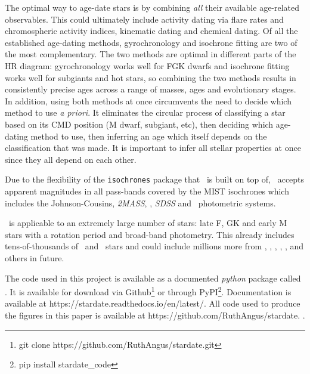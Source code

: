The optimal way to age-date stars is by combining {\it all} their available
age-related observables.
This could ultimately include activity dating via flare rates and
chromospheric activity indices, kinematic dating and chemical dating.
Of all the established age-dating methods, gyrochronology and isochrone
fitting are two of the most complementary.
The two methods are optimal in different parts of the HR diagram:
gyrochronology works well for FGK dwarfs and isochrone fitting works well for
subgiants and hot stars, so combining the two methods results in consistently
precise ages across a range of masses, ages and evolutionary stages.
In addition, using both methods at once circumvents the need to decide which
method to use {\it a priori}.
It eliminates the circular process of classifying a star based on its CMD
position (M dwarf, subgiant, etc), then deciding which age-dating method to
use, then inferring an age which itself depends on the classification that was
made.
It is important to infer all stellar properties at once since they all depend
on each other.

Due to the flexibility of the {\tt isochrones} package that \sd\ is built on
top of, \sd\ accepts apparent magnitudes in all pass-bands covered by the MIST
isochrones which includes the Johnson-Cousins, {\it 2MASS}, \Kepler, {\it
SDSS} and \Gaia\ photometric systems.

\sd\ is applicable to an extremely large number of stars: late F, GK and early
M stars with a rotation period and broad-band photometry.
This already includes tens-of-thousands of \kepler\ and \ktwo\ stars and could
include millions more from \tess, \lsst, \wfirst, \plato, \gaia, and others in
future.

The code used in this project is available as a documented {\it python}
package called \sd.
It is available for download via Github\footnote{git clone
https://github.com/RuthAngus/stardate.git} or through
PyPI\footnote{pip install stardate\_code}.
Documentation is available at https://stardate.readthedocs.io/en/latest/.
All code used to produce the figures in this paper is available at
https://github.com/RuthAngus/stardate.
.
